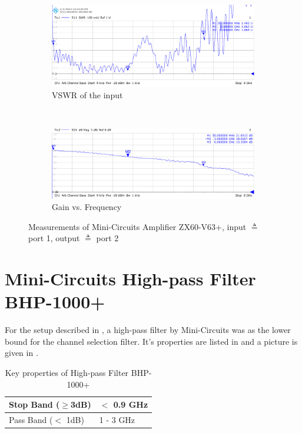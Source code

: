 \begin{figure}[p]
  \centering
  \begin{subfigure}{0.45\textwidth}
    \centering
    \includegraphics[width=\textwidth]{figures/network_analyzer/MCL_ZX60-V63+_Amplifier_S11_id1}
    \caption{\gls{VSWR} of the input}
  \end{subfigure}
  ~
  \begin{subfigure}{0.45\textwidth}
    \centering
    \includegraphics[width=\textwidth]{figures/network_analyzer/MCL_ZX60-V63+_Amplifier_S21_id1}
    \caption{Gain vs. Frequency}
  \end{subfigure}
  \caption{Measurements of Mini-Circuits Amplifier ZX60-V63+,
    input $\triangleq$ port 1, output $\triangleq$ port 2}
  \label{fig:comp_zx60_meas}
\end{figure}

\section{Mini-Circuits High-pass Filter BHP-1000+}
For the setup described in , a high-pass filter
by Mini-Circuits was as the lower bound for the channel selection filter.
It's properties are listed in  and a picture is given in
.

\begin{table}
  \centering
  \begin{tabular}{|l|l|}
    \hline
    Stop Band ($\geq$3dB) & $<$ 0.9 GHz \\ \hline
    Pass Band ($<$ 1dB) & 1 - 3 GHz \\ \hline
  \end{tabular}
  \caption{Key properties of High-pass Filter BHP-1000+ \cite{mc_bhp1000}}
  \label{tab:comp_zx60}
\end{table}

